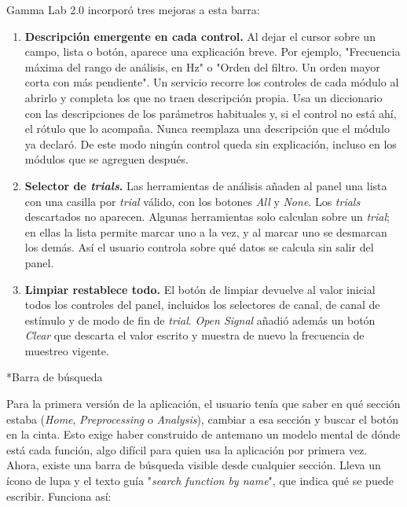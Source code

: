 \documentclass[12pt,letterpaper,oneside]{article}
\makeatletter
\newcommand{\subsubsubsection}[1]{%
  \@startsection{paragraph}{4}{\z@}{10pt plus 2pt minus 1pt}{4pt}%
    {\normalfont\normalsize\bfseries\itshape}*{#1}}
\makeatother
\begin{document}
Gamma Lab 2.0 incorporó tres mejoras a esta barra:

\begin{enumerate}
    \item \textbf{Descripción emergente en cada control.} Al dejar el cursor sobre un campo, lista o botón, aparece una explicación breve. Por ejemplo, "Frecuencia máxima del rango de análisis, en Hz" o "Orden del filtro. Un orden mayor corta con más pendiente". Un servicio recorre los controles de cada módulo al abrirlo y completa los que no traen descripción propia. Usa un diccionario con las descripciones de los parámetros habituales y, si el control no está ahí, el rótulo que lo acompaña. Nunca reemplaza una descripción que el módulo ya declaró. De este modo ningún control queda sin explicación, incluso en los módulos que se agreguen después.

    \item \textbf{Selector de \textit{trials}.} Las herramientas de análisis añaden al panel una lista con una casilla por \textit{trial} válido, con los botones \textit{All} y \textit{None}. Los \textit{trials} descartados no aparecen. Algunas herramientas solo calculan sobre un \textit{trial}; en ellas la lista permite marcar uno a la vez, y al marcar uno se desmarcan los demás. Así el usuario controla sobre qué datos se calcula sin salir del panel.

    \item \textbf{Limpiar restablece todo.} El botón de limpiar devuelve al valor inicial todos los controles del panel, incluidos los selectores de canal, de canal de estímulo y de modo de fin de \textit{trial}. \textit{Open Signal} añadió además un botón \textit{Clear} que descarta el valor escrito y muestra de nuevo la frecuencia de muestreo vigente.
\end{enumerate}

\subsubsubsection{Barra de búsqueda}

Para la primera versión de la aplicación, el usuario tenía que saber en qué sección estaba (\textit{Home}, \textit{Preprocessing} o \textit{Analysis}), cambiar a esa sección y buscar el botón en la cinta. Esto exige haber construido de antemano un modelo mental de dónde está cada función, algo difícil para quien usa la aplicación por primera vez. Ahora, existe una barra de búsqueda visible desde cualquier sección. Lleva un ícono de lupa y el texto guía "\textit{search function by name}", que indica qué se puede escribir. Funciona así:
\end{document}
